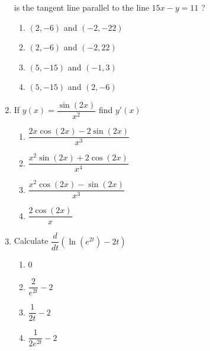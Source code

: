\documentclass{article}
\begin{document}
\begin{enumerate}
\begin{minipage}[t]{\linewidth}
is the tangent line parallel to the line \(15 x-y=11\) ?\\[0.1em]
		\begin{enumerate}
		\itemsep4em
			\item  $(2,-6)$ and $(-2,-22)$
			\item  $(2,-6)$ and $(-2,22)$
			\item  $(5,-15)$ and $(-1,3)$
			\item  $(5,-15)$ and $(2,-6)$
		\end{enumerate}
	\end{minipage}
	\item
	\begin{minipage}[t]{\linewidth}
		If \(y(x) = \dfrac{\sin(2x)}{x^2}\) find \(y'(x)\)\\[0.1em]
		\begin{enumerate}
		\itemsep1em
			\item  $\dfrac{2 x \cos(2 x) - 2 \sin(2 x)}{x^3}$
			\item  $\dfrac{ x^2 \sin(2x) + 2 \cos(2x)} {x^4}$
			\item  $\dfrac{ x^2 \cos(2x) - \sin(2x)} { x^3}$
			\item  $\dfrac{ 2 \cos(2x)}{x}$
		\end{enumerate}
	\end{minipage}
	\item
	\begin{minipage}[t]{\linewidth}
		Calculate \(\dfrac{d}{dt} \left( \ln(e^{2t}) - 2t \right)\)\\[0.1em]
		\begin{enumerate}
		\itemsep1em
			\item  0
			\item  $\dfrac{2}{e^{2t}}-2$
			\item  $\dfrac{1}{2t}-2$
			\item  $\dfrac{1}{2e^{2t}}-2$
		\end{enumerate}
	\end{minipage}
\end{enumerate}
\end{document}
